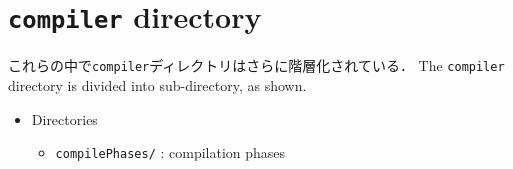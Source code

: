 \documentclass{jbook}
\newcommand{\txt}[2]{#2}
\newcommand{\code}[1]{\mbox{\large\tt #1}}
\begin{document}
\section{
\txt{\code{compiler}ディレクトリ}
{\code{compiler} directory}
}
\ifjp%
	これらの中で\code{compiler}ディレクトリはさらに階層化されている．
\else%
	The \code{compiler} directory is divided into sub-directory,
as shown.
\fi%

\begin{itemize}
\item \txt{ディレクトリ}{Directories}
\begin{itemize}
\item \code{compilePhases/} : \txt{コンパイルフェーズ}{compilation phases}


\end{itemize}
\end{itemize}
\end{document}
